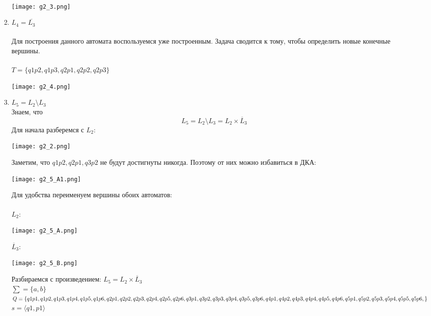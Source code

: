 \documentclass{article}
\begin{document}
\begin{enumerate}
    \\ 
    \begin{flushleft}
        \texttt{[image: g2\_3.png]}
    \end{flushleft}
    \item {$L_4 = \overline{L_3} $} \\ \\ 
    Для построения данного автомата воспользуемся уже построенным. Задача сводится к тому, чтобы определить новые конечные вершины. \\ \\
    $T = \{q1p2, q1p3, q2p1, q2p2, q2p3\}$
    \begin{flushleft}
        \texttt{[image: g2\_4.png]}
    \end{flushleft}
    \item {$L_5 = L_2 \setminus L_3 $} \\
    Знаем, что
    $$ L_5 = L_2 \setminus L_3 = L_2 \times \overline L_3$$
    Для начала разберемся с $L_2$:
    \begin{flushleft}
        \texttt{[image: g2\_2.png]}
    \end{flushleft}
    Заметим, что $q1p2, q2p1, q3p2$ не будут достигнуты никогда. Поэтому от них можно избавиться в ДКА:
    \begin{flushleft}
        \texttt{[image: g2\_5\_A1.png]}
    \end{flushleft}
    \newpage
    Для удобства переименуем вершины обоих автоматов: \\ \\
    $L_2:$
    \begin{flushleft}
        \texttt{[image: g2\_5\_A.png]}
    \end{flushleft}
    $\overline L_3:$
    \begin{flushleft}
        \texttt{[image: g2\_5\_B.png]}
    \end{flushleft}
    Разбираемся с произведением:
    $L_5 = L_2 \times \overline L_3$ \\
    $\sum = \{a, b\}$ \\
    $Q = \{q1p1, q1p2, q1p3, q1p4, q1p5, q1p6, q2p1, q2p2, q2p3, q2p4, q2p5, q2p6, q3p1, q3p2, q3p3, q3p4, q3p5, q3p6, q4p1, \\ q4p2, q4p3, q4p4, q4p5, q4p6, q5p1, q5p2, q5p3, q5p4, q5p5, q5p6,\}$ \\
    $s = \langle q1, p1 \rangle $ \\

\end{enumerate}
\end{document}
